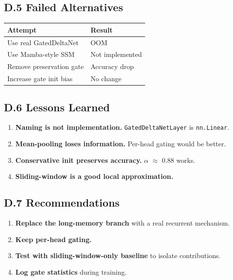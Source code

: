 \subsection{D.5 Failed Alternatives}

\begin{table}[H]
\centering
\small
\begin{tabular}{ll}
\toprule
\textbf{Attempt} & \textbf{Result} \\
\midrule
Use real GatedDeltaNet & OOM \\
Use Mamba-style SSM & Not implemented \\
Remove preservation gate & Accuracy drop \\
Increase gate init bias & No change \\
\bottomrule
\end{tabular}
\end{table}

\subsection{D.6 Lessons Learned}

\begin{enumerate}
\item \textbf{Naming is not implementation.} \texttt{GatedDeltaNetLayer} is \texttt{nn.Linear}.
\item \textbf{Mean-pooling loses information.} Per-head gating would be better.
\item \textbf{Conservative init preserves accuracy.} $\alpha$ $\approx$ 0.88 works.
\item \textbf{Sliding-window is a good local approximation.}

\end{enumerate}
\subsection{D.7 Recommendations}

\begin{enumerate}
\item \textbf{Replace the long-memory branch} with a real recurrent mechanism.
\item \textbf{Keep per-head gating.}
\item \textbf{Test with sliding-window-only baseline} to isolate contributions.
\item \textbf{Log gate statistics} during training.

\end{enumerate}

